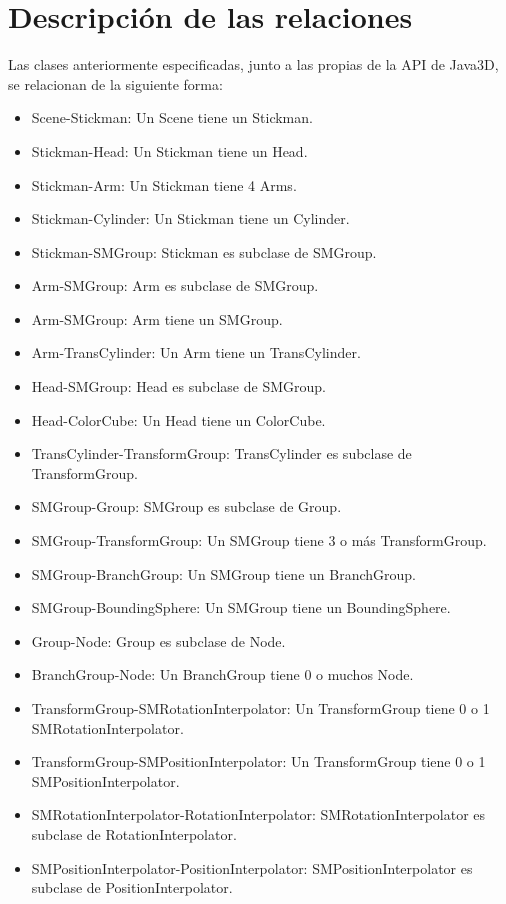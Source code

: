    \section{Descripción de las relaciones}
   Las clases anteriormente especificadas, junto a las propias de la API de Java3D, se relacionan de la siguiente forma:
   \begin{itemize}
      \item Scene-Stickman: Un Scene tiene un Stickman.
      \item Stickman-Head: Un Stickman tiene un Head.
      \item Stickman-Arm: Un Stickman tiene 4 Arms.
      \item Stickman-Cylinder: Un Stickman tiene un Cylinder.
      \item Stickman-SMGroup: Stickman es subclase de SMGroup.
      \item Arm-SMGroup: Arm es subclase de SMGroup.
      \item Arm-SMGroup: Arm tiene un SMGroup.
      \item Arm-TransCylinder: Un Arm tiene un TransCylinder.
      \item Head-SMGroup: Head es subclase de SMGroup.
      \item Head-ColorCube: Un Head tiene un ColorCube.
      \item TransCylinder-TransformGroup: TransCylinder es subclase de TransformGroup.
      \item SMGroup-Group: SMGroup es subclase de Group.
      \item SMGroup-TransformGroup: Un SMGroup tiene 3 o más TransformGroup.
      \item SMGroup-BranchGroup: Un SMGroup tiene un BranchGroup.
      \item SMGroup-BoundingSphere: Un SMGroup tiene un BoundingSphere.
      \item Group-Node: Group es subclase de Node.
      \item BranchGroup-Node: Un BranchGroup tiene 0 o muchos Node.
      \item TransformGroup-SMRotationInterpolator: Un TransformGroup tiene 0 o 1 SMRotationInterpolator.
      \item TransformGroup-SMPositionInterpolator: Un TransformGroup tiene 0 o 1 SMPositionInterpolator.
      \item SMRotationInterpolator-RotationInterpolator: SMRotationInterpolator es subclase de RotationInterpolator.
      \item SMPositionInterpolator-PositionInterpolator: SMPositionInterpolator es subclase de PositionInterpolator.
   \end{itemize}

